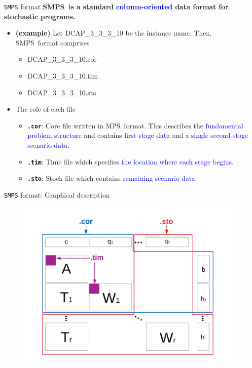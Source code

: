 \documentclass{beamer}
\newcommand{\smps}{\textsf{SMPS}}
\newcommand{\mps}{\textsf{MPS}}
\begin{document}
\begin{frame}{\texttt{SMPS} format}
\textbf{\smps\ is a standard \textcolor{blue}{column-oriented} data format for stochastic programs.} 
\begin{itemize}
\item \textbf{(example)} Let DCAP\_3\_3\_3\_10 be the instance name. Then, \smps\ format comprises
\begin{itemize}
\item DCAP\_3\_3\_3\_10.cor
\item DCAP\_3\_3\_3\_10.tim
\item DCAP\_3\_3\_3\_10.sto
\end{itemize}
\item The role of each file
\begin{itemize}
\item \textbf{\texttt{.cor}}: Core file written in \mps\ format. This describes the \textcolor{blue}{fundamental problem structure} and contains \textcolor{blue}{first-stage data} and \textcolor{blue}{a single second-stage scenario data.}
\item \textbf{\texttt{.tim}}: Time file which specifies \textcolor{blue}{the location where each stage begins.}
\item \textbf{\texttt{.sto}}: Stoch file which contains \textcolor{blue}{remaining scenario data.}
\end{itemize}
\end{itemize}
\end{frame}

\begin{frame}{\texttt{SMPS} format: Graphical description}
\vspace{-0.35cm}
\begin{figure}
\begin{center}
\includegraphics[width=\textwidth]{SMPS_description_slide}
\end{center}
\end{figure}
\end{frame}
\end{document}
